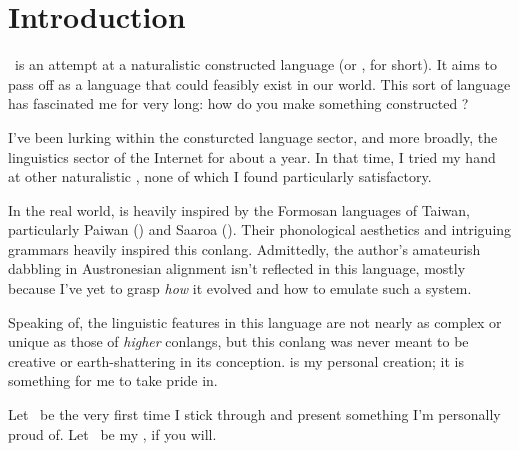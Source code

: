 \chapter{Introduction}
\langname~is an attempt at a naturalistic constructed language (or , for short).
It aims to pass off as a language that could feasibly exist in our world. This sort of
language has fascinated me for very long: how do you make something constructed ?

I've been lurking within the consturcted language sector, and more broadly, the linguistics
sector of the Internet for about a year. In that time, I tried my hand at other naturalistic ,
none of which I found particularly satisfactory.

In the real world, \langname{} is heavily inspired by the Formosan languages of Taiwan,
particularly Paiwan (\cite{chang_paiwan}) and Saaroa (\cite{pan_saaroa}).
Their phonological aesthetics and intriguing grammars heavily inspired this conlang.
Admittedly, the author's amateurish dabbling in Austronesian alignment isn't reflected in this language,
mostly because I've yet to grasp \textit{how} it evolved and how to emulate such a system.

Speaking of, the linguistic features in this language are not nearly as
complex or unique as those of \textit{higher} conlangs, but this conlang
was never meant to be creative or earth-shattering in its conception. \langname{}
is my personal creation; it is something for me to take pride in.

Let \langname~be the very first time I stick through and present something I'm personally proud of.
Let \langname~be my , if you will.

